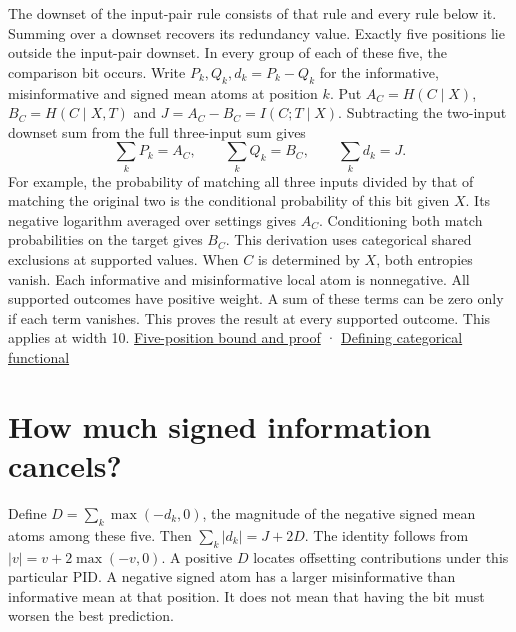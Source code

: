 The downset of the input-pair rule consists of that rule and every rule below it. Summing over a downset recovers its redundancy value. Exactly five positions lie outside the input-pair downset. In every group of each of these five, the comparison bit occurs. Write \(P_k,Q_k,d_k=P_k-Q_k\) for the informative, misinformative and signed mean atoms at position \(k\). Put \(A_C=H(C\mid X)\), \(B_C=H(C\mid X,T)\) and \(J=A_C-B_C=I(C;T\mid X)\). Subtracting the two-input downset sum from the full three-input sum gives \[
       \sum_k P_k=A_C,\qquad \sum_k Q_k=B_C,\qquad \sum_k d_k=J.
\] For example, the probability of matching all three inputs divided by that of matching the original two is the conditional probability of this bit given \(X\). Its negative logarithm averaged over settings gives \(A_C\). Conditioning both match probabilities on the target gives \(B_C\). This derivation uses categorical shared exclusions at supported values. When \(C\) is determined by \(X\), both entropies vanish. Each informative and misinformative local atom is nonnegative. All supported outcomes have positive weight. A sum of these terms can be zero only if each term vanishes. This proves the result at every supported outcome. This applies at width 10. \href{https://github.com/sepahead/pid-rs/blob/main/audit/research/categorical-third-source-budget-sharpness/EXPOSITION.md}{Five-position bound and proof} · \href{https://doi.org/10.1103/PhysRevE.103.032149}{Defining categorical functional}

\clearpage

\section{How much signed information cancels?}\label{how-much-signed-information-cancels}

Define \(D=\sum_k\max(-d_k,0)\), the magnitude of the negative signed mean atoms among these five. Then \(\sum_k |d_k|=J+2D\). The identity follows from \(|v|=v+2\max(-v,0)\). A positive \(D\) locates offsetting contributions under this particular PID. A negative signed atom has a larger misinformative than informative mean at that position. It does not mean that having the bit must worsen the best prediction.

